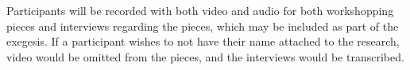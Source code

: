 
Participants will be recorded with both video and audio for both workshopping pieces and interviews regarding the pieces, which may be included as part of the exegesis. 
If a participant wishes to not have their name attached to the research, video would be omitted from the pieces, and the interviews would be transcribed.